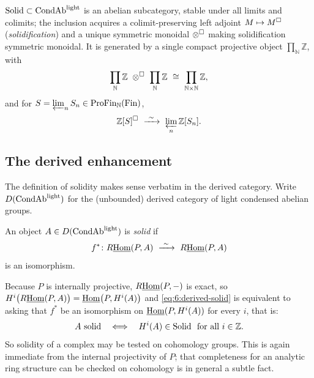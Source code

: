 \begin{theorem}
\label{thm:6:recall-structure}
$\mathrm{Solid}\subset\mathrm{CondAb}^{\mathrm{light}}$ is an abelian subcategory, stable under all limits and
colimits; the inclusion acquires a colimit-preserving left adjoint
$M\mapsto M^{\square}$ (\emph{solidification}) and a unique symmetric monoidal
$\otimes^{\square}$ making solidification symmetric monoidal. It is generated by a
single compact projective object $\prod_{\mathbb{N}}\mathbb{Z}$, with
\begin{equation}
\label{eq:6:generator-tensor-recall}
\prod_{\mathbb{N}}\mathbb{Z}\ \otimes^{\solid}\ \prod_{\mathbb{N}}\mathbb{Z}
\ \cong\ \prod_{\mathbb{N}\times\mathbb{N}}\mathbb{Z},
\end{equation}
and for $S=\varprojlim_n S_n\in\mathrm{ProFin}_{\mathbb{N}}(\mathrm{Fin})$,
\begin{equation*}
\mathbb{Z}[S]^{\solid}\ \xrightarrow{\ \sim\ }\ \varprojlim_{n}\mathbb{Z}[S_{n}].
\end{equation*}
\end{theorem}

\subsection{The derived enhancement}

The definition of solidity makes sense verbatim in the derived category. Write
$D(\mathrm{CondAb}^{\mathrm{light}})$ for the (unbounded) derived category of light condensed abelian
groups.

\begin{definition}
\label{def:6:derived-solid}
An object $A\in D(\mathrm{CondAb}^{\mathrm{light}})$ is \emph{solid} if
\begin{equation}
\label{eq:6:derived-solid}
f^{\ast}\colon R\underline{\operatorname{Hom}}(P,A)\ \xrightarrow{\ \sim\ }\ R\underline{\operatorname{Hom}}(P,A)
\end{equation}
is an isomorphism.
\end{definition}

Because $P$ is internally projective, $R\underline{\operatorname{Hom}}(P,-)$ is exact, so
$H^{i}\bigl(R\underline{\operatorname{Hom}}(P,A)\bigr)=\underline{\operatorname{Hom}}\bigl(P,H^{i}(A)\bigr)$ and
\eqref{eq:6:derived-solid} is equivalent to asking that $f^{\ast}$ be an
isomorphism on $\underline{\operatorname{Hom}}(P,H^{i}(A))$ for every $i$, that is:
\begin{equation*}
A\text{ solid}\quad\Longleftrightarrow\quad H^{i}(A)\in\mathrm{Solid}\ \text{ for all }i\in\mathbb{Z}.
\end{equation*}
So solidity of a complex may be tested on cohomology groups. This is again
immediate from the internal projectivity of $P$; that completeness for an
analytic ring structure can be checked on cohomology is in general a subtle fact.

